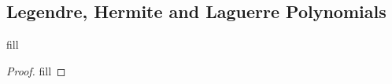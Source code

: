\subsection{Legendre, Hermite and Laguerre Polynomials}

\begin{exercise}{1}
fill
\end{exercise}
\begin{proof}
fill
\end{proof}